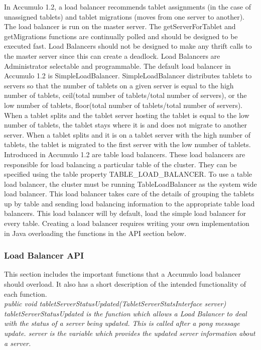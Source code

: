 \documentclass[letterpaper,onecolumn,12pt,titlepage]{article}
\begin{document}
In Accumulo 1.2, a load balancer recommends tablet assignments (in the case of unassigned tablets) and tablet migrations (moves from one server to another).
The load balancer is run on the master server.
The getServerForTablet and getMigrations functions are continually polled and should be designed to be executed fast.
Load Balancers should not be designed to make any thrift calls to the master server since this can create a deadlock.
Load Balancers are Administrator selectable and programmable.
The default load balancer in Accumulo 1.2 is SimpleLoadBalancer.
SimpleLoadBalancer distributes tablets to servers so that the number of tablets on a given server is equal to the high number of tablets, ceil(total number of tablets/total number of servers), or the low number of tablets, floor(total number of tablets/total number of servers).
When a tablet splits and the tablet server hosting the tablet is equal to the low number of tablets, the tablet stays where it is and does not migrate to another server.
When a tablet splits and it is on a tablet server with the high number of tablets, the tablet is migrated to the first server with the low number of tablets.
Introduced in Accumulo 1.2 are table load balancers.
These load balancers are responsible for load balancing a particular table of the cluster.
They can be specified using the table property TABLE\_LOAD\_BALANCER.
To use a table load balancer, the cluster must be running TableLoadBalancer as the system wide load balancer.
This load balancer takes care of the details of grouping the tablets up by table and sending load balancing information to the appropriate table load balancers.
This load balancer will by default, load the simple load balancer for every table.
Creating a load balancer requires writing your own implementation in Java overloading the functions in the API section below.

\subsubsection{Load Balancer API}

This section includes the important functions that a Accumulo load balancer should overload.
It also has a short description of the intended functionality of each function.\\

\noindent\it public void tabletServerStatusUpdated(TabletServerStatsInterface server)\rm\\
\indent tabletServerStatusUpdated is the function which allows a Load Balancer to deal with the status of a server being updated.
This is called after a pong message update. server is the variable which provides the updated server information about a server.\\
\end{document}
